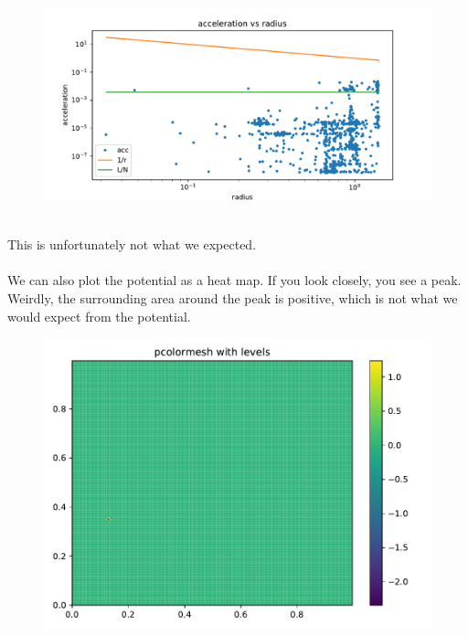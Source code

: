         \newpage
        \begin{figure}[h!]
            \centering
            \includegraphics[width=\textwidth]{../figures/acc2.pdf}
        \end{figure} \ \\ 
        This is unfortunately not what we expected. \\
        \\
        We can also plot the potential as a heat map. If you look closely, 
        you see a peak. Weirdly, the surrounding area around the peak is 
        positive, which is not what we would expect from the potential.
        \begin{figure}[h!]
            \centering
            \includegraphics[width=.7\textwidth]{../figures/pot.pdf}
        \end{figure} \ \\ 
